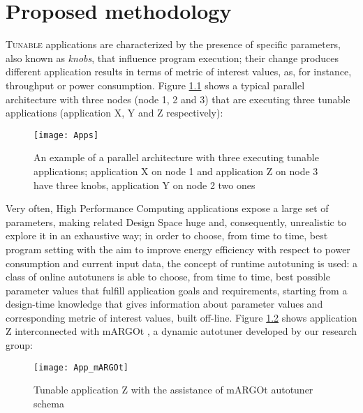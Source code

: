 \chapter{Proposed methodology}\label{methodology}

\lettrine{T}{unable} applications are characterized by the presence of specific parameters, also known as \textit{knobs}, that influence program execution; their change produces different application results in terms of metric of interest values, as, for instance, throughput or power consumption. Figure \ref{fig::appDef} shows a typical parallel architecture with three nodes (node 1, 2 and 3) that are executing three tunable applications (application X, Y and Z respectively):

\begin{figure}[H]

    \centering
    \texttt{[image: Apps]}
    \caption[Parallel architecture with tunable applications example]{An example of a parallel architecture with three executing tunable applications; application X on node 1 and application Z on node 3 have three knobs, application Y on node 2 two ones}
    \label{fig::appDef}
    
\end{figure}

Very often, High Performance Computing applications expose a large set of parameters, making related Design Space huge and, consequently, unrealistic to explore it in an exhaustive way; in order to choose, from time to time, best program setting with the aim to improve energy efficiency with respect to power consumption and current input data, the concept of runtime autotuning is used: a class of online autotuners is able to choose, from time to time, best possible parameter values that fulfill application goals and requirements, starting from a design-time knowledge that gives information about parameter values and corresponding metric of interest values, built off-line. Figure \ref{fig::appAut} shows application Z interconnected with mARGOt \cite{gadioli2015application}, a dynamic autotuner developed by our research group:

\begin{figure}[H]

    \centering
    \texttt{[image: App\_mARGOt]}
    \caption{Tunable application Z with the assistance of mARGOt autotuner schema}
    \label{fig::appAut}
    
\end{figure}

